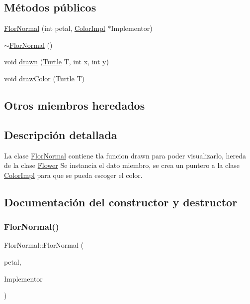\subsection*{Métodos públicos}
\begin{DoxyCompactItemize}
\item 
\hyperlink{classFlorNormal_a61f96415a64353a8863fc7969353f94e}{Flor\+Normal} (int petal, \hyperlink{classColorImpl}{Color\+Impl} $\ast$Implementor)
\item 
\hyperlink{classFlorNormal_a96ed2aba6c2f54bd4312330ad1d56d42}{$\sim$\+Flor\+Normal} ()
\item 
void \hyperlink{classFlorNormal_a615fc2015eeeaccd06d125d28efbd91c}{drawn} (\hyperlink{classTurtle}{Turtle} T, int x, int y)
\item 
void \hyperlink{classFlorNormal_a0ae303fc4e8528a3bd8f69e62a8b32c4}{draw\+Color} (\hyperlink{classTurtle}{Turtle} T)
\end{DoxyCompactItemize}
\subsection*{Otros miembros heredados}


\subsection{Descripción detallada}
La clase \hyperlink{classFlorNormal}{Flor\+Normal} contiene tla funcion drawn para poder visualizarlo, hereda de la clase \hyperlink{classFlower}{Flower}  Se instancia el dato miembro, se crea un puntero a la clase \hyperlink{classColorImpl}{Color\+Impl} para que se pueda escoger el color. 

\subsection{Documentación del constructor y destructor}
\mbox{\label{classFlorNormal_a61f96415a64353a8863fc7969353f94e}} 
\subsubsection{\texorpdfstring{Flor\+Normal()}{FlorNormal()}}
{\footnotesize\ttfamily Flor\+Normal\+::\+Flor\+Normal (\begin{DoxyParamCaption}\item[{int}]{petal,  }\item[{\hyperlink{classColorImpl}{Color\+Impl} $\ast$}]{Implementor }\end{DoxyParamCaption})}

